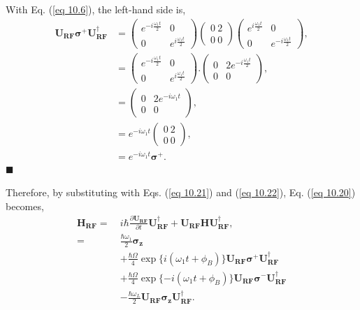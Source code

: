 \documentclass{article}
\begin{document}
With Eq. (\ref{eq 10.6}), the left-hand side is,
\begin{align*}
      \boldsymbol{U_{RF}\sigma^+}\boldsymbol{U}^\dagger_{\boldsymbol{RF}}&=
      \begin{pmatrix}
        e^{-i\frac{\omega_1t}{2}}&0\\0&e^{i\frac{\omega_1t}{2}}
    \end{pmatrix}
    \begin{pmatrix}
        0\ 2\\ 0 \ 0
    \end{pmatrix}
    \begin{pmatrix}
        e^{i\frac{\omega_1t}{2}}&0\\0&e^{-i\frac{\omega_1t}{2}}
    \end{pmatrix},\\
    &=\begin{pmatrix}
        e^{-i\frac{\omega_1t}{2}}&0\\0&e^{i\frac{\omega_1t}{2}}
    \end{pmatrix}.\begin{pmatrix}
       0& 2e^{-i\frac{\omega_1t}{2}}\\0&0
    \end{pmatrix},\\
    &= \begin{pmatrix}
        0& 2e^{-i\omega_1t}\\0&0
    \end{pmatrix},\\
    &= e^{-i\omega_1t}\begin{pmatrix}
        0\ 2\\ 0\ 0
    \end{pmatrix},\\
    &= e^{-i\omega_1t}\boldsymbol{\sigma^+}.
\end{align*}
\hfill $\blacksquare$

Therefore, by substituting with Eqs. (\ref{eq 10.21}) and (\ref{eq 10.22}), Eq. (\ref{eq 10.20})
becomes,
\begin{align*}\label{eq 10.25}
    \boldsymbol{H_{RF}}=\ & i\hbar\frac{\partial \boldsymbol{U_{RF}}}{\partial t}\boldsymbol{U}^\dagger_{\boldsymbol{RF}}+\boldsymbol{U_{RF}H}\boldsymbol{U}^\dagger_{\boldsymbol{RF}},\\
    =\ &\frac{\hbar\omega_1}{2}\boldsymbol{\sigma_z}\\
    &+\frac{\hbar\varOmega}{4}\exp\{i(\omega_1t+\phi_B)\}\boldsymbol{U_{RF}\sigma^+}\boldsymbol{U}^\dagger_{\boldsymbol{RF}}\\
    &+\frac{\hbar\varOmega}{4}\exp\{-i(\omega_1t+\phi_B)\}\boldsymbol{U_{RF}\sigma^-}\boldsymbol{U}^\dagger_{\boldsymbol{RF}}\\
    &-\frac{\hbar\omega_L}{2}\boldsymbol{U_{RF}\sigma_z}\boldsymbol{U}^\dagger_{\boldsymbol{RF}}. \tag{10.25}
\end{align*}
\end{document}

